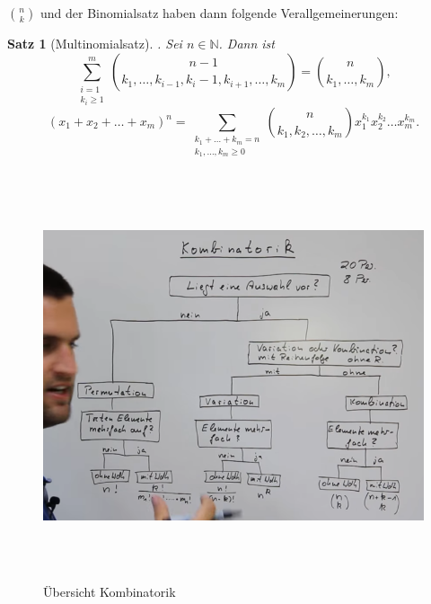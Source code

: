 \documentclass[12pt, twoside]{article}
\newcommand{\N}{\mathbb{N}}
\newtheorem{Sa}{Satz}[subsection]
\begin{document}
$\binom{n}{k}$ und der Binomialsatz haben dann folgende Verallgemeinerungen:


\begin{Sa}[Multinomialsatz]. Sei $n \in \N$. Dann ist
$$
\sum_{\substack{i=1 \\ k_i\ge1}}^{m}\binom{n-1}{k_1, \dots, k_{i-1}, k_i-1, k_{i+1}, \dots, k_m} = \binom{n}{k_1, \dots, k_m}, 
$$
$$
(x_1+x_2+ \ldots +x_m)^n = \sum_{\substack{k_1+\ldots+k_m=n \\ k_1, \dots, k_m\ge0}} \binom{n}{k_1, k_2, \dots, k_m}x_1^{k_1} x_2^{k_2} \ldots x_m^{k_m} .
$$
\end{Sa}



\begin{figure}
	\centering
	\includegraphics[height=12cm]{bld1.png}
	\caption{Übersicht Kombinatorik}
	\label{img:grafik-dummy}
\end{figure}
\end{document}
